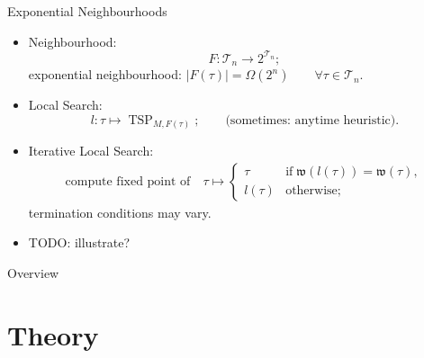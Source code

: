 \documentclass[
  size=10pt,
  style=klope,
  paper=screen,
  pauseslide,
  nopagebreaks,
  hlsections,
  fleqn
]{powerdot}
\def\todo{\color{red}}
\def\eqitspace{\vspace{-5mm}}
\begin{document}
\begin{slide}{Exponential Neighbourhoods}
\begin{itemize}
  \item
  Neighbourhood:
  \begin{equation}
    F: \mathcal{T}_n \to 2^{\mathcal{T}_n};
  \end{equation}
  exponential neighbourhood:
  $\left\vert F(\tau) \right\vert = \Omega(2^n) \qquad \forall \tau \in \mathcal{T}_n$.
  \item
  Local Search:
  \begin{equation}
    l: \tau \mapsto \operatorname{TSP}_{M,F(\tau)};
    \qquad \text{(sometimes: anytime heuristic)}.
  \end{equation}
  \eqitspace
  \item
  Iterative Local Search:
  \begin{align}
    \text{compute fixed point of}
    \quad
    \tau \mapsto
    \begin{cases}
      \tau \quad & \text{if} \; \mathfrak{w}\left(l\left(\tau\right)\right) = \mathfrak{w}\left(\tau\right),
      \\
      l\left(\tau\right) & \text{otherwise};
    \end{cases}
  \end{align}
  termination conditions may vary.
  \item
  {\todo TODO:} illustrate?
\end{itemize}
\end{slide}

\begin{slide}[toc=,bm=]{Overview}
\tableofcontents[content=currentsection,type=1]
\end{slide}

\section[template=wideslide]{Theory}
\end{document}
